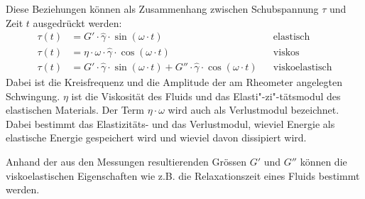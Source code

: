 Diese Beziehungen können als Zusammenhang zwischen Schubspannung $\tau$ und Zeit $t$ ausgedrückt werden:
\begin{align}
    \label{eq:schwingungsmodi}
    \tau\left( t \right)&=G'\cdot\hat{\gamma}\cdot \sin\left( \omega\cdot t \right) && \text{elastisch}\\
    \tau\left( t \right)&=\eta\cdot\omega\cdot\hat{\gamma}\cdot \cos\left( \omega\cdot t \right)&& \text{viskos}\\
    \tau\left( t \right)&=G'\cdot\hat{\gamma}\cdot \sin\left( \omega\cdot t \right)+G''\cdot\hat{\gamma}\cdot \cos\left( \omega\cdot t \right)&& \text{viskoelastisch}
\end{align}
Dabei ist  die Kreisfrequenz und  die Amplitude der am Rheometer angelegten Schwingung. $\eta$ ist die Viskosität des Fluids und  das Elasti"-zi"-tätsmodul des elastischen Materials. Der Term $\eta\cdot\omega$ wird auch als Verlustmodul  bezeichnet. Dabei bestimmt das Elastizitäts- und das Verlustmodul, wieviel Energie als elastische Energie gespeichert wird und wieviel davon dissipiert wird.

Anhand der aus den Messungen resultierenden Grössen $G'$ und $G''$ können die viskoelastischen Eigenschaften wie z.B. die Relaxationszeit eines Fluids bestimmt werden.

